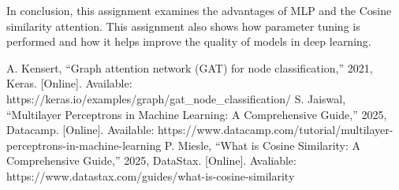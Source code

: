 \documentclass[conference]{IEEEtran}
\begin{document}
In conclusion, this assignment examines the advantages of MLP and the Cosine
similarity attention. This assignment also shows how parameter tuning is
performed and how it helps improve the quality of models in deep learning.

\begin{thebibliography}{00}
 A. Kensert, “Graph attention network (GAT) for node
    classification,” 2021, Keras. [Online]. Available:
    https://keras.io/examples/graph/gat\_node\_classification/
 S. Jaiswal, “Multilayer Perceptrons in Machine Learning: A
    Comprehensive Guide,” 2025, Datacamp. [Online]. Available:
    https://www.datacamp.com/tutorial/multilayer-perceptrons-in-machine-learning
 P. Miesle, “What is Cosine Similarity: A Comprehensive
    Guide,” 2025, DataStax. [Online]. Avaliable:
    https://www.datastax.com/guides/what-is-cosine-similarity
\end{thebibliography}
\end{document}
